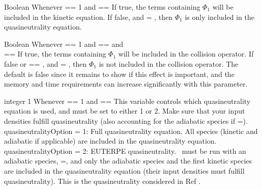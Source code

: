 \myhrule

{Boolean}
{\true}
{Whenever  == 1 and  == \true}
{If true, the terms containing $\Phi_1$ will be included in the kinetic equation. 
If false, and  = \true, then $\Phi_1$ is only included in the quasineutrality equation. 
}

\myhrule

{Boolean}
{\false}
{Whenever  == 1 and  == \true and\\  == \true}
{If true, the terms containing $\Phi_1$ will be included in the collision operator. 
If false or  == \false, and  = \true, then $\Phi_1$ is not included in the collision operator. 
The default is false since it remains to show if this effect is important, and the memory and time requirements can increase significantly with this parameter.
}

\myhrule

{integer}
{1}
{Whenever  == 1 and  == \true}
{This variable controls which quasineutrality equation is used, and must be set to either 1 or 2. Make sure that your input densities fulfill quasineutrality (also accounting for the adiabatic species if =\true).\\

{\ttfamily quasineutralityOption} = 1: Full quasineutrality equation. All species (kinetic and adiabatic if applicable) are included in the quasineutrality equation.\\

{\ttfamily quasineutralityOption} = 2: {\ttfamily EUTERPE} quasineutrality. \sfincs~must be run with an adiabatic species, =\true, and only the adiabatic species and the first kinetic species are included in the quasineutrality equation (their input densities must fulfill quasineutrality). This is the quasineutrality considered in Ref \cite{Regana2017}.
}


%

